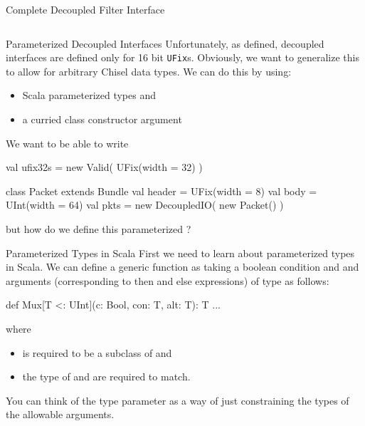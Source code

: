 \documentclass[xcolor=pdflatex,dvipsnames,table]{beamer}
\begin{document}
\begin{frame}[fragile]{Complete Decoupled Filter Interface}
\begin{columns}
\end{columns}
\end{frame}

\begin{frame}[fragile]{Parameterized Decoupled Interfaces}
Unfortunately, as defined, decoupled interfaces are defined only for 16 bit \verb+UFix+s.  
Obviously, we want to generalize this to allow for arbitrary Chisel data types.  
We can do this by using:
\begin{itemize}
\item Scala parameterized types and 
\item a curried class constructor argument
\end{itemize}

We want to be able to write
\begin{scala}
val ufix32s = new Valid( UFix(width = 32) )

class Packet extends Bundle {
  val header = UFix(width = 8)
  val body   = UInt(width = 64)
}
val pkts    = new DecoupledIO( new Packet() )
\end{scala}

\noindent
but how do we define this parameterized ?
\end{frame}

\begin{frame}[fragile]{Parameterized Types in Scala}
First we need to learn about parameterized types in Scala.
We can define a generic  function as taking a boolean condition and  and  arguments (corresponding to then and else expressions) of type  as follows:

\begin{scala}
def Mux[T <: UInt](c: Bool, con: T, alt: T): T { ... }
\end{scala}

\noindent
where 
\begin{itemize}
\item {} is required to be a subclass of  and 
\item the type of  and  are required to match.
\end{itemize}

\noindent
You can think of the type parameter as a way of just constraining the types of the allowable arguments.

\end{frame}
\end{document}

